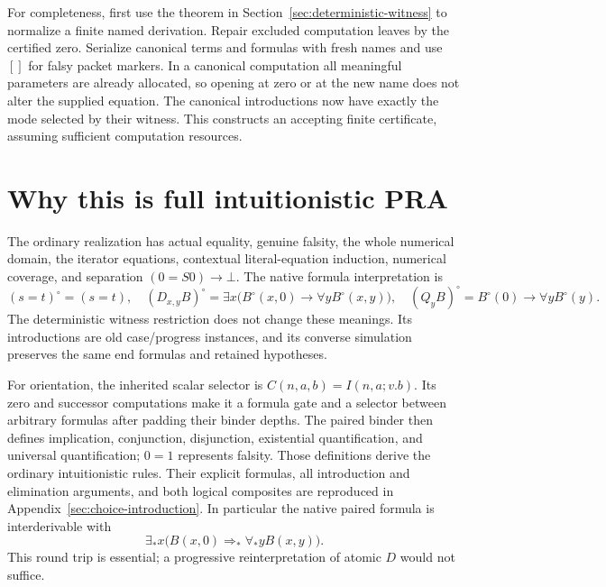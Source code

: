 \documentclass[11pt,letterpaper]{article}
\theoremstyle{definition}\newtheorem{definition}[theorem]{Definition}
\theoremstyle{remark}\newtheorem{remark}[theorem]{Remark}
\begin{document}
For completeness, first use the theorem in
Section~\ref{sec:deterministic-witness} to normalize a finite named
derivation. Repair excluded computation leaves by the certified zero.
Serialize canonical terms and formulas with fresh names and use $[]$
for falsy packet markers. In a canonical computation all meaningful
parameters are already allocated, so opening at zero or at the new name
does not alter the supplied equation. The canonical introductions now
have exactly the mode selected by their witness. This constructs an
accepting finite certificate, assuming sufficient computation resources.

\section{Why this is full intuitionistic PRA}
\label{sec:bridge-summary}

The ordinary realization has actual equality, genuine falsity, the whole
numerical domain, the iterator equations, contextual literal-equation
induction, numerical coverage, and separation $(0=S0)\to\bot$.
The native formula interpretation is
\[
 (s=t)^\circ=(s=t),\quad
 (D_{x,y}B)^\circ=\exists x\bigl(B^\circ(x,0)\to\forall yB^\circ(x,y)\bigr),
 \quad (Q_yB)^\circ=B^\circ(0)\to\forall yB^\circ(y).
\]
The deterministic witness restriction does not change these meanings.
Its introductions are old case/progress instances, and its converse
simulation preserves the same end formulas and retained hypotheses.

For orientation, the inherited scalar selector is
$C(n,a,b)=I(n,a;v.b)$. Its zero and successor computations make it a
formula gate and a selector between arbitrary formulas after padding
their binder depths. The paired binder then defines implication,
conjunction, disjunction, existential quantification, and universal
quantification; $0=1$ represents falsity. Those definitions derive the
ordinary intuitionistic rules. Their explicit formulas, all introduction
and elimination arguments, and both logical composites are reproduced
in Appendix~\ref{sec:choice-introduction}. In particular the native
paired formula is interderivable with
\[
 \exists_*x\bigl(B(x,0)\Rightarrow_*\forall_*yB(x,y)\bigr).
\]
This round trip is essential; a progressive reinterpretation of atomic
$D$ would not suffice.
\end{document}
